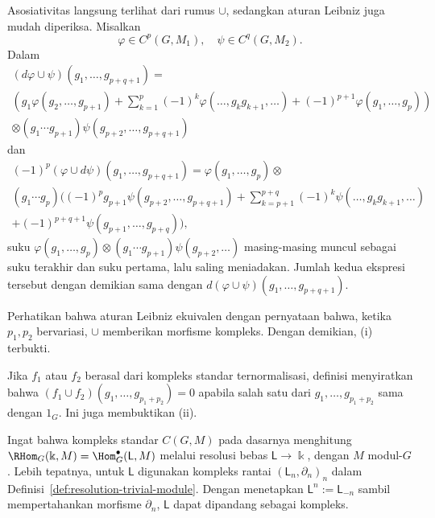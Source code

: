 \begin{bukti}
	Asosiativitas langsung terlihat dari rumus $\cup$, sedangkan aturan Leibniz
	juga mudah diperiksa. Misalkan
	\[ \varphi \in C^p(G, M_1), \quad \psi \in C^q(G, M_2). \]
	Dalam
	\begin{multline*}
		(d\varphi \cup \psi)(g_1, \ldots, g_{p+q+1}) = \\
		\left( g_1 \varphi(g_2, \ldots, g_{p+1}) + \sum_{k=1}^p (-1)^k \varphi(\ldots, g_k g_{k+1}, \ldots) + (-1)^{p+1} \varphi(g_1, \ldots, g_p) \right) \\
		\otimes (g_1 \cdots g_{p+1}) \psi(g_{p+2}, \ldots, g_{p+q+1})
	\end{multline*}
dan
	\begin{multline*}
		(-1)^p (\varphi \cup d\psi)(g_1, \ldots, g_{p+q+1}) = \varphi(g_1, \ldots, g_p) \otimes \\
		(g_1 \cdots g_p) \bigg( (-1)^p g_{p+1} \psi(g_{p+2}, \ldots, g_{p+q+1}) + \sum_{k=p+1}^{p+q} (-1)^k \psi(\ldots, g_k g_{k+1}, \ldots) \\
		+ (-1)^{p+q+1} \psi(g_{p+1}, \ldots, g_{p+q}) \bigg),
	\end{multline*}
	suku
	$\varphi(g_1,\ldots,g_p)\otimes(g_1\cdots g_{p+1})
	\psi(g_{p+2},\ldots)$ masing-masing muncul sebagai suku terakhir dan suku
	pertama, lalu saling meniadakan. Jumlah kedua ekspresi tersebut dengan
	demikian sama dengan
	$d(\varphi\cup\psi)(g_1,\ldots,g_{p+q+1})$.

	Perhatikan bahwa aturan Leibniz ekuivalen dengan pernyataan bahwa, ketika
	$p_1,p_2$ bervariasi, $\cup$ memberikan morfisme kompleks. Dengan demikian,
	(i) terbukti.

	Jika $f_1$ atau $f_2$ berasal dari kompleks standar ternormalisasi, definisi
	menyiratkan bahwa
	$(f_1\cup f_2)(g_1,\ldots,g_{p_1+p_2})=0$ apabila salah satu dari
	$g_1,\ldots,g_{p_1+p_2}$ sama dengan $1_G$. Ini juga membuktikan (ii).
\end{bukti}

Ingat bahwa kompleks standar $C(G,M)$ pada dasarnya menghitung
$\RHom_G(\Bbbk,M)=\Hom_G^\bullet(\mathsf{L},M)$ melalui resolusi bebas
$\mathsf{L}\to\Bbbk$, dengan $M$ modul-$G$. Lebih tepatnya, untuk
$\mathsf{L}$ digunakan kompleks rantai $(\mathsf{L}_n,\partial_n)_n$ dalam
Definisi~\ref{def:resolution-trivial-module}. Dengan menetapkan
$\mathsf{L}^n:=\mathsf{L}_{-n}$ sambil mempertahankan morfisme $\partial_n$,
$\mathsf{L}$ dapat dipandang sebagai kompleks.

